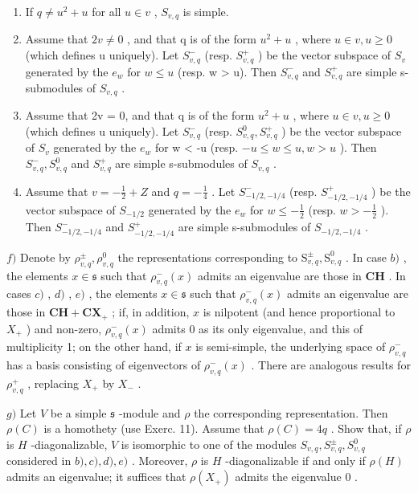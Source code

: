 \begin{enumerate}
\def\labelenumi{\alph{enumi})}
\setcounter{enumi}{1}
\item
  If \(q \neq u^2 + u\) for all \(u \in v\) , \(S_{v,q}\) is simple.
\item
  Assume that \(2v \neq 0\) , and that q is of the form \(u^{2} + u\) , where \(u \in v, u \geq 0\) (which defines u uniquely). Let \(S_{v,q}^{-}\) (resp. \(S_{v,q}^{+}\) ) be the vector subspace of \(S_{v}\) generated by the \(e_{w}\) for \(w \leq u\) (resp. w \textgreater{} u). Then \(S_{v,q}^{-}\) and \(S_{v,q}^{+}\) are simple s-submodules of \(S_{v,q}\) .
\item
  Assume that 2v = 0, and that q is of the form \(u^{2} + u\) , where \(u \in v, u \geq 0\) (which defines u uniquely). Let \(S_{v,q}^{-}\) (resp. \(S_{v,q}^{0}, S_{v,q}^{+}\) ) be the vector subspace of \(S_{v}\) generated by the \(e_{w}\) for w \textless{} -u (resp. \(-u \leq w \leq u, w > u\) ). Then \(S_{v,q}^{-}, S_{v,q}^{0}\) and \(S_{v,q}^{+}\) are simple s-submodules of \(S_{v,q}\) .
\item
  Assume that \(v = -\frac{1}{2} + Z\) and \(q = -\frac{1}{4}\) . Let \(S_{-1/2,-1/4}^{-}\) (resp. \(S_{-1/2,-1/4}^{+}\) ) be the vector subspace of \(S_{-1/2}\) generated by the \(e_{w}\) for \(w \leq -\frac{1}{2}\) (resp. \(w > -\frac{1}{2}\) ). Then \(S_{-1/2,-1/4}^{-}\) and \(S_{-1/2,-1/4}^{+}\) are simple s-submodules of \(S_{-1/2,-1/4}\) .
\end{enumerate}

\(f)\) Denote by \(\rho_{v,q}^{\pm},\rho_{v,q}^{0}\) the representations corresponding to \(\mathrm{S}_{v,q}^{\pm},\mathrm{S}_{v,q}^{0}\) . In case \(b)\) , the elements \(x\in \mathfrak{s}\) such that \(\rho_{v,q}^{-}(x)\) admits an eigenvalue are those in \(\mathbf{CH}\) . In cases \(c)\) , \(d)\) , \(e)\) , the elements \(x\in \mathfrak{s}\) such that \(\rho_{v,q}^{-}(x)\) admits an eigenvalue are those in \(\mathbf{CH} + \mathbf{CX}_+\) ; if, in addition, \(x\) is nilpotent (and hence proportional to \(X_{+}\) ) and non-zero, \(\rho_{v,q}^{-}(x)\) admits 0 as its only eigenvalue, and this of multiplicity 1; on the other hand, if \(x\) is semi-simple, the underlying space of \(\rho_{v,q}^{-}\) has a basis consisting of eigenvectors of \(\rho_{v,q}^{-}(x)\) . There are analogous results for \(\rho_{v,q}^{+}\) , replacing \(X_{+}\) by \(X_{-}\) .

\(g)\) Let \(V\) be a simple \(\mathfrak{s}\) -module and \(\rho\) the corresponding representation. Then \(\rho(C)\) is a homothety (use Exerc. 11). Assume that \(\rho(C) = 4q\) . Show that, if \(\rho\) is \(H\) -diagonalizable, \(V\) is isomorphic to one of the modules \(S_{v,q}, S_{v,q}^{\pm}, S_{v,q}^{0}\) considered in \(b), c), d), e)\) . Moreover, \(\rho\) is \(H\) -diagonalizable if and only if \(\rho(H)\) admits an eigenvalue; it suffices that \(\rho(X_{+})\) admits the eigenvalue \(0\) .

